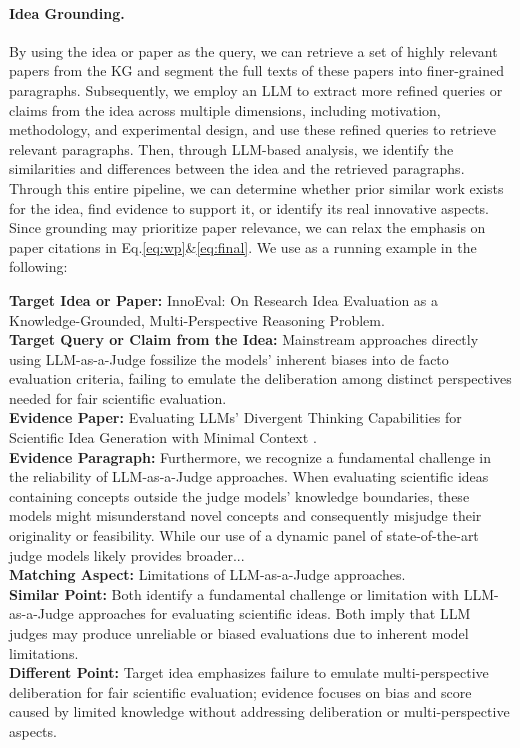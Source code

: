 \paragraph{Idea Grounding.}
By using the idea or paper as the query, we can retrieve a set of highly relevant papers from the KG and segment the full texts of these papers into finer-grained paragraphs.
Subsequently, we employ an LLM to extract more refined queries or claims from the idea across multiple dimensions, including motivation, methodology, and experimental design, and use these refined queries to retrieve relevant paragraphs.
Then, through LLM-based analysis, we identify the similarities and differences between the idea and the retrieved paragraphs.
Through this entire pipeline, we can determine whether prior similar work exists for the idea, find evidence to support it, or identify its real innovative aspects.
Since grounding may prioritize paper relevance, we can relax the emphasis on paper citations in Eq.\ref{eq:wp}\&\ref{eq:final}.
We use \citep{innoeval} as a running example in the following:
\begin{tcolorbox}[breakable,colback=persona!20!white, colframe=persona!60!black, title=\textbf{An Example of Idea Grounding}]
    \label{box:idea_grounding}
    \textbf{Target Idea or Paper:} InnoEval: On Research Idea Evaluation as a Knowledge-Grounded, Multi-Perspective Reasoning Problem.\\
    \textbf{Target Query or Claim from the Idea:} Mainstream approaches directly using LLM-as-a-Judge fossilize the models' inherent biases into de facto evaluation criteria, failing to emulate the deliberation among distinct perspectives needed for fair scientific evaluation.\\

    \textbf{Evidence Paper:} Evaluating LLMs' Divergent Thinking Capabilities for Scientific Idea Generation with Minimal Context \citep{divergent}.\\
    \textbf{Evidence Paragraph:} Furthermore, we recognize a fundamental challenge in the reliability of LLM-as-a-Judge approaches. When evaluating scientific ideas containing concepts outside the judge models' knowledge boundaries, these models might misunderstand novel concepts and consequently misjudge their originality or feasibility. While our use of a dynamic panel of state-of-the-art judge models likely provides broader...\\
    
    \textbf{Matching Aspect:} Limitations of LLM-as-a-Judge approaches.\\
    \textbf{Similar Point:} Both identify a fundamental challenge or limitation with LLM-as-a-Judge approaches for evaluating scientific ideas. Both imply that LLM judges may produce unreliable or biased evaluations due to inherent model limitations.\\
    \textbf{Different Point:} Target idea emphasizes failure to emulate multi-perspective deliberation for fair scientific evaluation; evidence focuses on bias and score caused by limited knowledge without addressing deliberation or multi-perspective aspects.
\end{tcolorbox}


